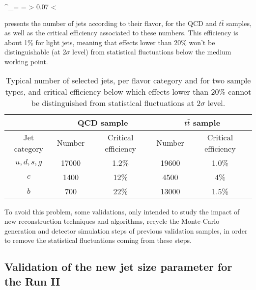     {
        \sigma^_\epsilon = \frac{\sigma_\epsilon}{\epsilon} =  > 0.07
        \hspace*{1cm}
        \Rightarrow
        \hspace*{1cm}
        \epsilon < 
    }

     presents the number of jets according to their flavor,
    for the QCD and $t\bar{t}$ samples, as well as the critical efficiency associated
    to these numbers. This efficiency is about 1\% for light jets, meaning that effects
    lower than 20\% won't be distinguishable (at 2$\sigma$ level) from statistical
    fluctuations below the medium working point.

    \begin{table}
    \centering
    \begin{tabular}{|c|cc|cc|}
        \hline
                         & \multicolumn{2}{c}{QCD sample} & \multicolumn{2}{c}{$t\bar{t}$ sample} \\
        \hline
           Jet category  & Number & Critical efficiency   & Number & Critical efficiency \\
        \hline
            $u,d,s,g$    & 17000  & 1.2\%                 & 19600  & 1.0\% \\
            $c$          & 1400   & 12\%                  & 4500   & 4\%   \\
            $b$          & 700    & 22\%                  & 13000  & 1.5\% \\
        \hline
    \end{tabular}
        \caption{Typical number of selected jets, per flavor category and for two sample types,
        and critical efficiency below which effects lower than 20\% cannot be distinguished from
        statistical fluctuations at 2$\sigma$ level. \label{tab:criticalEfficiencyBTag}}
    \end{table}

    To avoid this problem, some validations, only intended to study the impact of new
    reconstruction techniques and algorithms, recycle the Monte-Carlo generation and detector simulation
    steps of previous validation samples, in order to remove the statistical fluctuations
    coming from these steps.

    \subsection{Validation of the new jet size parameter for the Run II}

